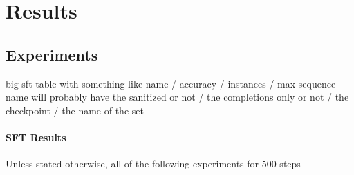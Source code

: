 \documentclass[a4paper,10pt]{article}
\title{}
\author{Jose Rodriguez}
\begin{document}
\maketitle

\begin{abstract}

\end{abstract}

\section{Results}
\subsection{Experiments}
big sft table with something like name / accuracy / instances / max sequence
name will probably have the sanitized or not / the completions only or not / the checkpoint / the name of the set


\paragraph{SFT Results}
Unless stated otherwise, all of the following experiments for 500 steps
\end{document}
